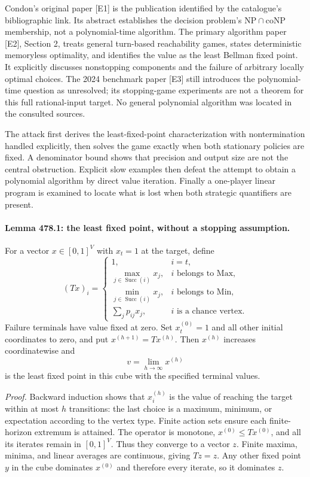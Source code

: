 \documentclass[11pt]{article}
\begin{document}
Condon's original paper [E1] is the publication identified by the catalogue's
bibliographic link. Its abstract establishes the decision problem's
$\mathrm{NP}\cap\mathrm{coNP}$ membership, not a polynomial-time
algorithm. The primary algorithm paper [E2], Section 2, treats general
turn-based reachability games, states deterministic memoryless optimality,
and identifies the value as the least Bellman fixed point. It explicitly
discusses nonstopping components and the failure of arbitrary locally
optimal choices. The 2024 benchmark paper [E3] still introduces the
polynomial-time question as unresolved; its stopping-game experiments
are not a theorem for this full rational-input target. No general polynomial
algorithm was located in the consulted sources.

The attack first derives the least-fixed-point characterization with
nontermination handled explicitly, then solves the game exactly when both
stationary policies are fixed. A denominator bound shows that precision
and output size are not the central obstruction. Explicit slow examples
then defeat the attempt to obtain a polynomial algorithm by direct value
iteration. Finally a one-player linear program is examined to locate what
is lost when both strategic quantifiers are present.

\paragraph{Lemma 478.1: the least fixed point, without a stopping assumption.}
For a vector $x\in[0,1]^V$ with $x_t=1$ at the target, define
\[
 (Tx)_i=\begin{cases}
 1,&i=t,\\
 \max_{j\in\operatorname{Succ}(i)}x_j,&i\text{ belongs to Max},\\
 \min_{j\in\operatorname{Succ}(i)}x_j,&i\text{ belongs to Min},\\
 \sum_jp_{ij}x_j,&i\text{ is a chance vertex}.
 \end{cases}
\]
Failure terminals have value fixed at zero. Set $x^{(0)}_t=1$ and all
other initial coordinates to zero, and put $x^{(h+1)}=Tx^{(h)}$.
Then $x^{(h)}$ increases coordinatewise and
\begin{equation}\label{a478:least}
                         v=\lim_{h\to\infty}x^{(h)}
\end{equation}
is the least fixed point in this cube with the specified terminal values.

\emph{Proof.} Backward induction shows that $x^{(h)}_i$ is the value of
reaching the target within at most $h$ transitions: the last choice is a
maximum, minimum, or expectation according to the vertex type. Finite
action sets ensure each finite-horizon extremum is attained. The operator
is monotone, $x^{(0)}\leq Tx^{(0)}$, and all its iterates remain in
$[0,1]^V$. Thus they converge to a vector $z$. Finite maxima, minima,
and linear averages are continuous, giving $Tz=z$. Any other fixed point
$y$ in the cube dominates $x^{(0)}$ and therefore every iterate, so it
dominates $z$.
\end{document}
